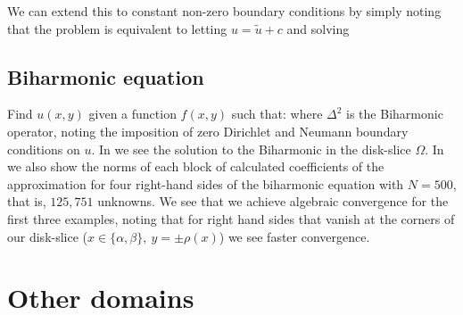 
We can extend this to constant non-zero boundary conditions by simply noting that the problem 
is equivalent to letting $u = \tilde{u} + c$ and solving


\subsection{Biharmonic equation}

Find $u(x,y)$ given a function $f(x,y)$ such that:
where $\Delta^2$ is the Biharmonic operator, noting the imposition of zero Dirichlet and Neumann boundary conditions on $u$. In  we see the solution to the Biharmonic  in the disk-slice $\Omega$. In  we also show the norms of each block of calculated coefficients of the approximation for four right-hand sides of the biharmonic equation with $N = 500$, that is, $125,751$ unknowns.  We see that we achieve algebraic convergence for the first three examples, noting that for right hand sides that vanish at the corners of our disk-slice ($x\in\{\alpha,\beta\}, \: y = \pm \rho(x)$) we see faster convergence.


\section{Other domains}

